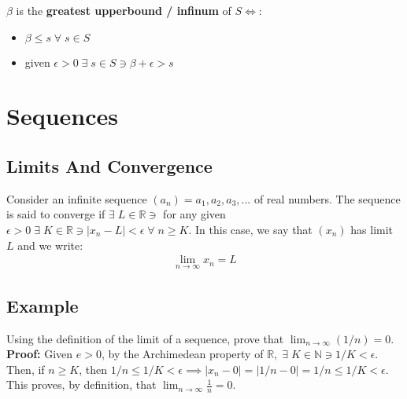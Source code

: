 \documentclass[12pt, a4paper]{article}
\newcommand{\ex}{\; \exists \;}
\newcommand{\real}{\mathbb{R}}
\newcommand{\nat}{\mathbb{N}}
\newcommand{\all}{\; \forall \;}
\begin{document}
$\beta$ is the \textbf{greatest upperbound / infinum} of $S \Longleftrightarrow$:
\begin{itemize}
  \item $\beta \leq s \; \forall \; s \in S$
  \item given $\epsilon > 0 \ex s \in S \ni \beta + \epsilon > s$ 
\end{itemize}

\section{Sequences}

\subsection{Limits And Convergence}
Consider an infinite sequence $(a_n) = a_1, a_2, a_3, ...$ of real numbers.
The sequence is said to converge if $ \exists \; L \in \real \ni $ for any given
$ \epsilon > 0 \ex K \in \real \ni |x_n - L| < \epsilon \all n \geq K$. In
this case, we say that $(x_n)$ has limit $L$ and we write:
\begin{gather*}
  \lim_{n \to \infty} x_n = L
\end{gather*}

\subsection{Example}
Using the definition of the limit of a sequence, prove that 
$\lim_{n \to \infty} (1/n)= 0$. \\

\textbf{Proof:} Given $e > 0$, by the Archimedean property of $\real,
\ex K \in \nat \ni 1/K < \epsilon.$ Then, if $n \geq K$, then $1/n \leq
1/K < \epsilon \implies |x_n - 0| = |1/n - 0| = 1/n \leq 1/K < \epsilon$.
This proves, by definition, that $\lim_{n \to \infty} \frac{1}{n} = 0$.
\end{document}
